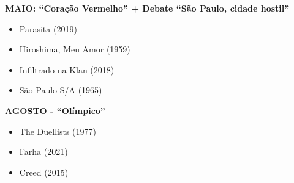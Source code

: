\begin{multicols}{2}
    \textbf{MAIO: “Coração Vermelho” + Debate “São Paulo, cidade hostil”}\vspace{-0.5cm}
    \begin{itemize}[itemsep=-0.5cm]
        \item Parasita (2019)
        \item Hiroshima, Meu Amor (1959)
        \item Infiltrado na Klan (2018)
        \item São Paulo S/A (1965)
    \end{itemize}

    \textbf{AGOSTO - “Olímpico”}\vspace{-0.5cm}
    \begin{itemize}[itemsep=-0.5cm]
        \item The Duellists (1977)
        \item Farha (2021)
        \item Creed (2015)
    \end{itemize}

\end{multicols}